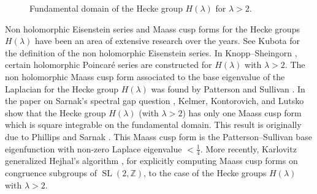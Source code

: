 \documentclass[11pt]{amsart}
\numberwithin{equation}{section}
\theoremstyle{remark}
\DeclareMathOperator{\SL}{SL}
\begin{document}
\begin{figure}[t]\label{fig:fundamental_domain}
    \centering
    \def\lambdaVal{4}  %
    \pgfmathsetmacro{\Lval}{\lambdaVal/2}

\caption{Fundamental domain of the Hecke group $H(\lambda)$ for $\lambda > 2$.}
\end{figure}
\par
Non holomorphic Eisenstein series and Maass cusp forms for the Hecke groups $H(\lambda)$ have been an area of extensive research over the years. See Kubota \cite{Kubota} for the definition of the non holomorphic Eisenstein series. In Knopp--Sheingorn \cite{Knopp-Sheingorn}, certain holomorphic Poincar\'e series are constructed for $H(\lambda)$ with $\lambda > 2.$ The non holomorphic Maass cusp form associated to the base eigenvalue of the Laplacian for the Hecke group $H(\lambda)$ was found by Patterson \cite{Patterson} and Sullivan \cite{Sullivan}. In the paper on Sarnak's spectral gap question \cite{Kelmer-Kontorovich-Lutsko}, Kelmer, Kontorovich, and Lutsko show that the Hecke group $H(\lambda)$ (with $\lambda >2$) has only one Maass cusp form which is square integrable on the fundamental domain. This result is originally due to Phillips and Sarnak \cite{Phillips-Sarnak}. This Maass cusp form is  the Patterson--Sullivan base eigenfunction  with non-zero Laplace eigenvalue $< \tfrac{1}{4}.$ More recently, Karlovitz \cite{karlovitz2022extensionhejhalsalgorithminfinite} generalized Hejhal's algorithm \cite{Hejhal}, for explicitly computing  Maass cusp forms on congruence subgroups of $\SL(2,\mathbb Z)$, to the case of the Hecke groups $H(\lambda)$ with $\lambda >2.$
\end{document}

